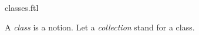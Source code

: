 \documentclass{stex}
\begin{document}
\begin{smodule}{classes.ftl}


\begin{fakeforthel}
  \begin{signature}
    A \emph{class} is a notion.
    Let a \emph{collection} stand for a class.
  \end{signature}
\end{fakeforthel}

\end{smodule}
\end{document}
